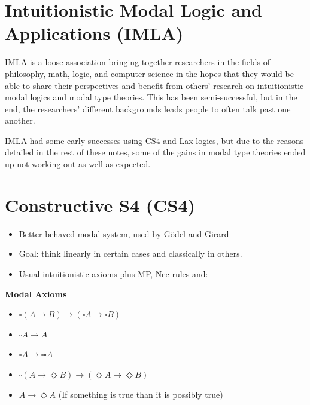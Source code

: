 \documentclass[11pt]{article}
\begin{document}
\section{Intuitionistic Modal Logic and Applications (IMLA)}
IMLA is a loose association bringing together researchers in the fields of philosophy, math, logic, and computer science in the hopes that they would be able to share their perspectives and benefit from others' research on intuitionistic modal logics and modal type theories. This has been semi-successful, but in the end, the researchers' different backgrounds leads people to often talk past one another. 

IMLA had some early successes using CS4 and Lax logics, but due to the reasons detailed in the rest of these notes, some of the gains in modal type theories ended up not working out as well as expected.

\section{Constructive S4 (CS4)}

\begin{itemize}
    \item Better behaved modal system, used by Gödel and Girard
    \item Goal: think linearly in certain cases and classically in others.
    \item Usual intuitionistic axioms plus MP, Nec rules and:
\end{itemize}


\textbf{Modal Axioms}\cite{balbiani2024constructives4modallogics}\cite{Natasha2001CategoricalKripkeCS4}

\begin{itemize}
    \item $\square(A \rightarrow B) \rightarrow (\square A \rightarrow \square B)$
    \item $\square A \rightarrow A$
    \item $\square A \rightarrow \square\square A$
    \item $\square(A \rightarrow \Diamond B) \rightarrow (\Diamond A \rightarrow \Diamond B)$
    \item $A \rightarrow \Diamond A$ (If something is true than it is possibly true)
\end{itemize}
\end{document}
